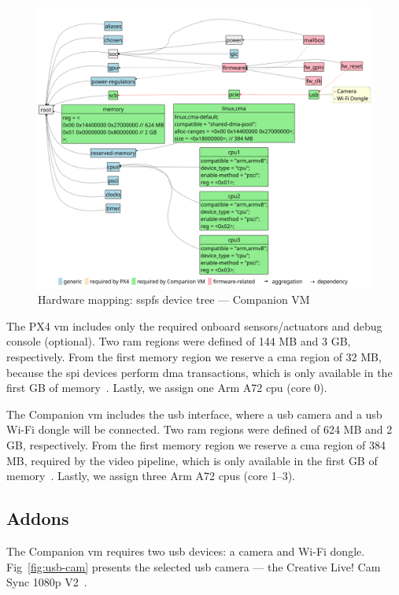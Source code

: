 \begin{figure}[!hbt]
  \centering
  \includegraphics[width=1.0\textwidth]{./img/pdf/hw-map-3} 
  \caption[Hardware mapping: SSPFS device tree --- Companion VM]{Hardware
    mapping: \gls{sspfs} device tree --- Companion VM}%
  \label{fig:hw-map-3}
\end{figure}

The PX4 \gls{vm} includes only the required onboard
sensors/actuators and debug console (optional). Two \gls{ram} regions were
defined of 144 MB and 3 GB, respectively. From the first memory region we
reserve a \gls{cma} region of 32 MB, because the \gls{spi} devices perform \gls{dma} transactions, which is only
available in the first GB of memory~\cite{bcm2711peripherals}. Lastly, we assign one Arm
A72 \gls{cpu} (core 0).

The Companion \gls{vm} includes the \gls{usb} interface, where a \gls{usb} camera and a
\gls{usb} Wi-Fi dongle will be connected. Two \gls{ram} regions were
defined of 624 MB and 2 GB, respectively. From the first memory region we
reserve a \gls{cma} region of 384 MB, required by the video pipeline, which is only
available in the first GB of memory~\cite{bcm2711peripherals}. Lastly, we assign three Arm
A72 \glspl{cpu} (core 1--3).

\subsection{Addons}
\label{sec:addons}
The Companion \gls{vm} requires two \gls{usb} devices: a camera and Wi-Fi
dongle. Fig~\ref{fig:usb-cam} presents the selected \gls{usb} camera --- the
Creative Live! Cam Sync 1080p V2~\cite{creative-cam}.

